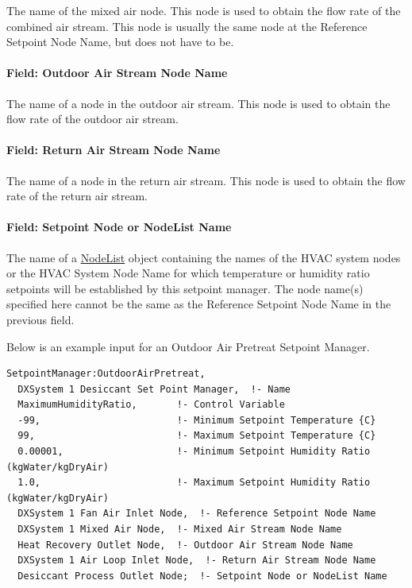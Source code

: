 The name of the mixed air node. This node is used to obtain the flow rate of the combined air stream. This node is usually the same node at the Reference Setpoint Node Name, but does not have to be.

\paragraph{Field: Outdoor Air Stream Node Name}\label{field-outdoor-air-stream-node-name-000}

The name of a node in the outdoor air stream. This node is used to obtain the flow rate of the outdoor air stream.

\paragraph{Field: Return Air Stream Node Name}\label{field-return-air-stream-node-name-000}

The name of a node in the return air stream. This node is used to obtain the flow rate of the return air stream.

\paragraph{Field: Setpoint Node or NodeList Name}\label{field-setpoint-node-or-nodelist-name-9}

The name of a \hyperref[nodelist]{NodeList} object containing the names of the HVAC system nodes or the HVAC System Node Name for which temperature or humidity ratio setpoints will be established by this setpoint manager. The node name(s) specified here cannot be the same as the Reference Setpoint Node Name in the previous field.


Below is an example input for an Outdoor Air Pretreat Setpoint Manager.

\begin{lstlisting}
SetpointManager:OutdoorAirPretreat,
  DXSystem 1 Desiccant Set Point Manager,  !- Name
  MaximumHumidityRatio,       !- Control Variable
  -99,                        !- Minimum Setpoint Temperature {C}
  99,                         !- Maximum Setpoint Temperature {C}
  0.00001,                    !- Minimum Setpoint Humidity Ratio (kgWater/kgDryAir)
  1.0,                        !- Maximum Setpoint Humidity Ratio (kgWater/kgDryAir)
  DXSystem 1 Fan Air Inlet Node,  !- Reference Setpoint Node Name
  DXSystem 1 Mixed Air Node,  !- Mixed Air Stream Node Name
  Heat Recovery Outlet Node,  !- Outdoor Air Stream Node Name
  DXSystem 1 Air Loop Inlet Node,  !- Return Air Stream Node Name
  Desiccant Process Outlet Node;  !- Setpoint Node or NodeList Name
\end{lstlisting}


